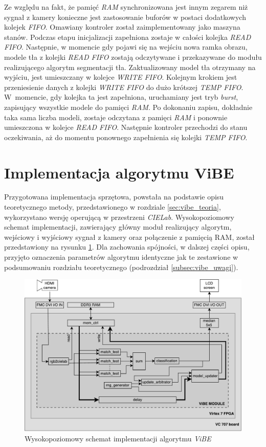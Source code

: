 Ze względu na fakt, że pamięć \textit{RAM} synchronizowana jest innym zegarem niż sygnał z kamery konieczne jest zastosowanie buforów w postaci dodatkowych kolejek \textit{FIFO}. Omawiany kontroler został zaimplementowany jako maszyna stanów. Podczas etapu inicjalizacji zapełniona zostaje w całości kolejka \textit{READ FIFO}. Następnie, w momencie gdy pojawi się na wejściu nowa ramka obrazu, modele tła z kolejki \textit{READ FIFO} zostają odczytywane i przekazywane do modułu realizującego algorytm segmentacji tła. Zaktualizowany model tła otrzymany na wyjściu, jest umieszczany w kolejce \textit{WRITE FIFO}. Kolejnym krokiem jest przeniesienie danych z kolejki \textit{WRITE FIFO} do dużo krótszej \textit{TEMP FIFO}. W~momencie, gdy kolejka ta jest zapełniona, uruchamiany jest tryb \textit{burst}, zapisujący wszystkie modele do pamięci \textit{RAM}. Po dokonaniu zapisu, dokładnie taka sama liczba modeli, zostaje odczytana z pamięci \textit{RAM} i ponownie umieszczona w kolejce \textit{READ FIFO}. Następnie kontroler przechodzi do stanu oczekiwania, aż do momentu ponownego zapełnienia się kolejki \textit{TEMP FIFO}.

\section{Implementacja algorytmu ViBE}
\label{sec:fpga_vibe}

Przygotowana implementacja sprzętowa, powstała na podstawie opisu teoretycznego metody, przedstawionego w rozdziale \ref{sec:vibe_teoria}, wykorzystano wersję operującą w przestrzeni \textit{CIELab}.  Wysokopoziomowy schemat implementacji, zawierający główny moduł realizujący algorytm, wejściowy i wyjściowy sygnał z kamery oraz połączenie z pamięcią RAM, został przedstawiony na rysunku \ref{fig:vibe_diagram}. Dla zachowania spójności, w dalszej części opisu, przyjęto oznaczenia parametrów algorytmu identyczne jak te zestawione w podsumowaniu rozdziału teoretycznego (podrozdział \ref{subsec:vibe_uwagi}).

	\begin{figure}[h!]
		\centering
		\includegraphics[scale=0.6]{img/4/vibe.pdf}
		\caption{Wysokopoziomowy schemat implementacji algorytmu \textit{ViBE}}
		\label{fig:vibe_diagram}
	\end{figure}

